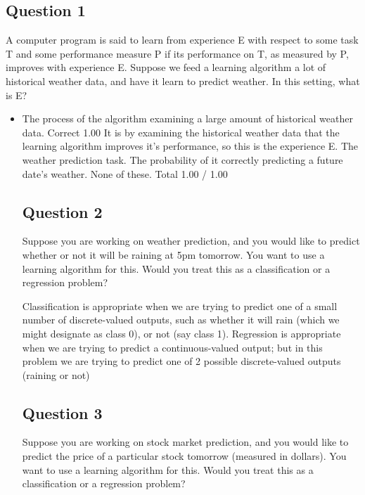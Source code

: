 \subsection*{Question 1}
A computer program is said to learn from experience E with respect to some task T and some performance measure P if its performance on T, as measured by P, improves with experience E. Suppose we feed a learning algorithm a lot of historical weather data, and have it learn to predict weather. In this setting, what is E?

\begin{itemize}
\item The process of the algorithm examining a large amount of historical weather data.	Correct	1.00	It is by examining the historical weather data that the learning algorithm improves it's performance, so this is the experience E.
The weather prediction task.			
The probability of it correctly predicting a future date's weather.			
None of these.			
Total		1.00 / 1.00	
\subsection*{Question 2}
Suppose you are working on weather prediction, and you would like to predict whether or not it will be raining at 5pm tomorrow. You want to use a learning algorithm for this. Would you treat this as a classification or a regression problem?

	Classification is appropriate when we are trying to predict one of a small number of discrete-valued outputs, such as whether it will rain (which we might designate as class 0), or not (say class 1).
Regression is appropriate when we are trying to predict a continuous-valued output; but in this problem we are trying to predict one of 2 possible discrete-valued outputs (raining or not)
	
\subsection*{Question 3}
Suppose you are working on stock market prediction, and you would like to predict the price of a particular stock tomorrow (measured in dollars). You want to use a learning algorithm for this. Would you treat this as a classification or a regression problem?


\end{itemize}
